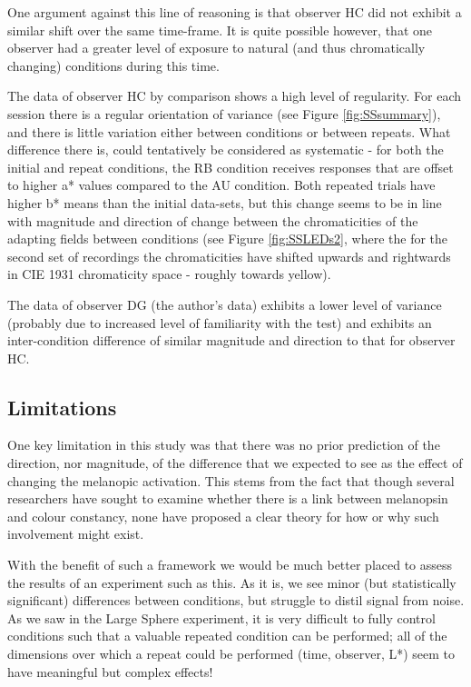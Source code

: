 One argument against this line of reasoning is that observer HC did not exhibit a similar shift over the same time-frame. It is quite possible however, that one observer had a greater level of exposure to natural (and thus chromatically changing) conditions during this time.

The data of observer HC by comparison shows a high level of regularity. For each session there is a regular orientation of variance (see Figure \ref{fig:SSsummary}), and there is little variation either between conditions or between repeats. What difference there is, could tentatively be considered as systematic - for both the initial and repeat conditions, the RB condition receives responses that are offset to higher a* values compared to the AU condition. Both repeated trials have higher b* means than the initial data-sets, but this change seems to be in line with magnitude and direction of change between the chromaticities of the adapting fields between conditions (see Figure \ref{fig:SSLEDs2}, where the for the second set of recordings the chromaticities have shifted upwards and rightwards in \gls{CIE} 1931 chromaticity space - roughly towards yellow).

The data of observer DG (the author's data) exhibits a lower level of variance (probably due to increased level of familiarity with the test) and exhibits an inter-condition difference of similar magnitude and direction to that for observer HC.

\subsection{Limitations}

One key limitation in this study was that there was no prior prediction of the direction, nor magnitude, of the difference that we expected to see as the effect of changing the melanopic activation. This stems from the fact that though several researchers have sought to examine whether there is a link between melanopsin and colour constancy, none have proposed a clear theory for how or why such involvement might exist.

With the benefit of such a framework we would be much better placed to assess the results of an experiment such as this. As it is, we see minor (but statistically significant) differences between conditions, but struggle to distil signal from noise. As we saw in the Large Sphere experiment, it is very difficult to fully control conditions such that a valuable repeated condition can be performed; all of the dimensions over which a repeat could be performed (time, observer, L*) seem to have meaningful but complex effects!

